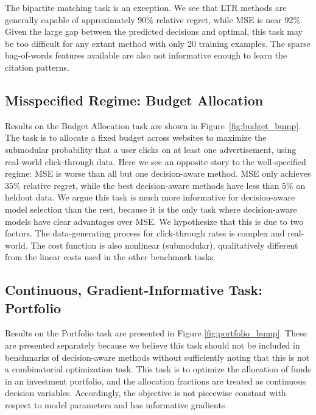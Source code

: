 The bipartite matching task is an exception. We see that LTR methods are generally capable of approximately $90\%$ relative regret, while MSE is near $92\%$. Given the large gap between the predicted decisions and optimal, this task may be too difficult for any extant method with only 20 training examples. The sparse bag-of-words features available are also not informative enough to learn the citation patterns.

\subsection{Misspecified Regime: Budget Allocation}
\label{sec:bench-budget}

Results on the Budget Allocation task are shown in Figure~\ref{fig:budget_bump}. The task is to allocate a fixed budget across websites to maximize the submodular probability that a user clicks on at least one advertisement, using real-world click-through data. Here we see an opposite story to the well-specified regime: MSE is worse than all but one decision-aware method. MSE only achieves $35\%$ relative regret, while the best decision-aware methods have less than $5\%$ on heldout data. We argue this task is much more informative for decision-aware model selection than the rest, because it is the only task where decision-aware models have clear advantages over MSE. We hypothesize that this is due to two factors. The data-generating process for click-through rates is complex and real-world. The cost function is also nonlinear (submodular), qualitatively different from the linear costs used in the other benchmark tasks.

\subsection{Continuous, Gradient-Informative Task: Portfolio}
\label{sec:bench-portfolio}

Results on the Portfolio task are presented in Figure \ref{fig:portfolio_bump}. These are presented separately because we believe this task should not be included in benchmarks of decision-aware methods without sufficiently noting that this is not a combinatorial optimization task. This task is to optimize the allocation of funds in an investment portfolio, and the allocation fractions are treated as continuous decision variables. Accordingly, the objective is not piecewise constant with respect to model parameters and has informative gradients.

